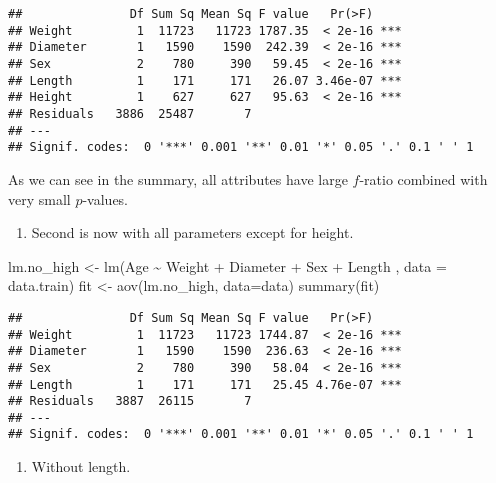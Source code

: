 \documentclass[
]{article}
\newenvironment{Shaded}{\begin{snugshade}}{\end{snugshade}}
\newcommand{\AttributeTok}[1]{\textcolor[rgb]{0.77,0.63,0.00}{#1}}
\newcommand{\FunctionTok}[1]{\textcolor[rgb]{0.00,0.00,0.00}{#1}}
\newcommand{\NormalTok}[1]{#1}
\newcommand{\OtherTok}[1]{\textcolor[rgb]{0.56,0.35,0.01}{#1}}
\newcommand{\SpecialCharTok}[1]{\textcolor[rgb]{0.00,0.00,0.00}{#1}}
\providecommand{\tightlist}{%
  \setlength{\itemsep}{0pt}\setlength{\parskip}{0pt}}
\begin{document}
\begin{verbatim}
##               Df Sum Sq Mean Sq F value   Pr(>F)    
## Weight         1  11723   11723 1787.35  < 2e-16 ***
## Diameter       1   1590    1590  242.39  < 2e-16 ***
## Sex            2    780     390   59.45  < 2e-16 ***
## Length         1    171     171   26.07 3.46e-07 ***
## Height         1    627     627   95.63  < 2e-16 ***
## Residuals   3886  25487       7                     
## ---
## Signif. codes:  0 '***' 0.001 '**' 0.01 '*' 0.05 '.' 0.1 ' ' 1
\end{verbatim}

As we can see in the summary, all attributes have large \(f\)-ratio
combined with very small \(p\)-values.

\begin{enumerate}
\def\labelenumi{\arabic{enumi}.}
\setcounter{enumi}{1}
\tightlist
\item
  Second is now with all parameters except for height.
\end{enumerate}

\begin{Shaded}
\begin{Highlighting}[]
\NormalTok{lm.no\_high }\OtherTok{\textless{}{-}} \FunctionTok{lm}\NormalTok{(Age }\SpecialCharTok{\textasciitilde{}}\NormalTok{ Weight }\SpecialCharTok{+}\NormalTok{ Diameter }\SpecialCharTok{+}\NormalTok{ Sex }\SpecialCharTok{+}\NormalTok{ Length , }\AttributeTok{data =}\NormalTok{ data.train)}
\NormalTok{fit }\OtherTok{\textless{}{-}} \FunctionTok{aov}\NormalTok{(lm.no\_high, }\AttributeTok{data=}\NormalTok{data)}
\FunctionTok{summary}\NormalTok{(fit)}
\end{Highlighting}
\end{Shaded}

\begin{verbatim}
##               Df Sum Sq Mean Sq F value   Pr(>F)    
## Weight         1  11723   11723 1744.87  < 2e-16 ***
## Diameter       1   1590    1590  236.63  < 2e-16 ***
## Sex            2    780     390   58.04  < 2e-16 ***
## Length         1    171     171   25.45 4.76e-07 ***
## Residuals   3887  26115       7                     
## ---
## Signif. codes:  0 '***' 0.001 '**' 0.01 '*' 0.05 '.' 0.1 ' ' 1
\end{verbatim}

\begin{enumerate}
\def\labelenumi{\arabic{enumi}.}
\setcounter{enumi}{2}
\tightlist
\item
  Without length.
\end{enumerate}
\end{document}
